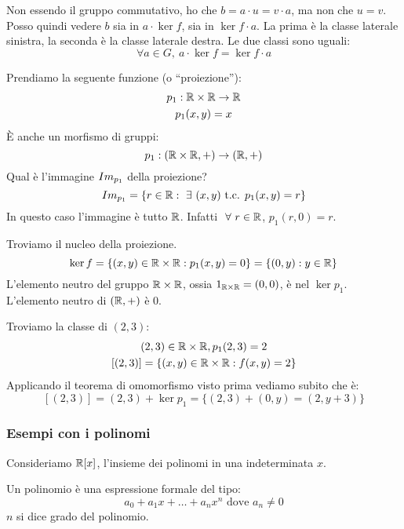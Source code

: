 Non essendo il gruppo commutativo, ho che $b = a \cdot u = v \cdot a$, ma non che $u = v$. Posso quindi vedere $b$ sia in $ a \cdot \ker f$, sia in $\ker f \cdot a$. La prima \`e la classe laterale sinistra, la seconda \`e la classe laterale destra. Le due classi sono uguali:
\[
\forall a \in G ,\ a \cdot \ker f = \ker f \cdot a
\]
\begin{exmp}
Prendiamo la seguente funzione (o ``proiezione''):
\begin{gather*}
p_1 : \mathbb{R} \times \mathbb{R} \to \mathbb{R} \\
p_1 (x, y) = x
\end{gather*}
\`E anche un morfismo di gruppi:
\[
p_1 : (\mathbb{R} \times \mathbb{R}, +) \to (\mathbb{R}, +)
\]
Qual \`e l'immagine $Im_{p_1}$ della proiezione?
\[
\image{p_1} = \{ r \in \reals : \exists (x, y) \text{ t.c. } p_1 (x, y) = r \}
\]
In questo caso l'immagine \`e tutto $\mathbb{R}$. Infatti $\forall r \in \reals$, $ p_1(r, 0) = r$.

Troviamo il nucleo della proiezione.
\[
\ker f = \{ (x, y) \in \mathbb{R} \times \mathbb{R} : p_1(x, y) = 0 \} = \{ (0, y) : y \in \mathbb{R} \}
\]
L'elemento neutro del gruppo $\mathbb{R} \times \mathbb{R}$, ossia $1_{\mathbb{R} \times \mathbb{R}} = (0, 0)$, \`e nel $ \ker p_1$. L'elemento neutro di $(\mathbb{R}, +)$ \`e 0.

Troviamo la classe di $(2, 3)$:
\begin{gather*}
(2, 3) \in \mathbb{R} \times \mathbb{R}, p_1(2, 3) = 2 \\
[(2, 3)] = \{ (x, y) \in \mathbb{R} \times \mathbb{R} : f(x, y) = 2\}
\end{gather*}
Applicando il teorema di omomorfismo visto prima vediamo subito che \`e:
\[
[(2,3)] = (2, 3) + \ker p_1 = \{ (2, 3) + (0, y) = (2, y + 3) \}
\]
\end{exmp}

\subsubsection{Esempi con i polinomi}

Consideriamo $\mathbb{R}[x]$, l'insieme dei polinomi in una indeterminata $x$.

\begin{defn}[Polinomio]
Un polinomio \`e una espressione formale del tipo:
\[
a_0 + a_1 x + \dots + a_n x^n \text{ dove } a_n \neq 0
\]
$n$ si dice grado del polinomio.
\end{defn}

